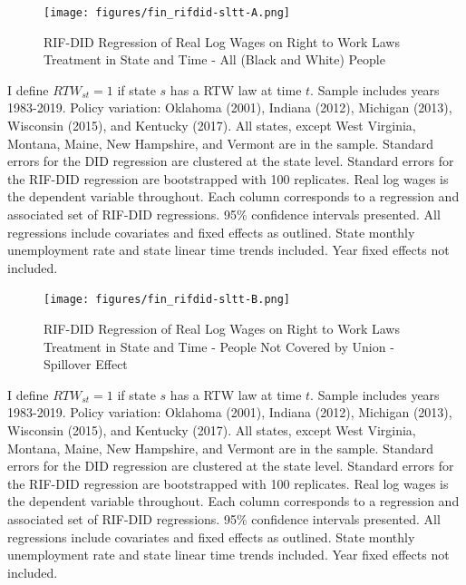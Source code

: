 \documentclass[11pt]{article}
\begin{document}
{\pagebreak
\begin{landscape}
\begin{figure}[ht!]
\centering
    \caption{RIF-DID Regression of Real Log Wages on Right to Work Laws Treatment in State and Time - All (Black and White) People}\label{fig:rifdid-sltt-A}
    \texttt{[image: figures/fin\_rifdid-sltt-A.png]}
\end{figure}
\footnotesize{I define $RTW_{st} = 1$ if state $s$ has a RTW law at time $t$. Sample includes years 1983-2019. Policy variation: Oklahoma (2001), Indiana (2012), Michigan (2013), Wisconsin (2015), and Kentucky (2017). All states, except West Virginia, Montana, Maine, New Hampshire, and Vermont are in the sample. Standard errors for the DID regression are clustered at the state level. Standard errors for the RIF-DID regression are bootstrapped with 100 replicates. Real log wages is the dependent variable throughout. Each column corresponds to a regression and associated set of RIF-DID regressions. 95\% confidence intervals presented. All regressions include covariates and fixed effects as outlined. State monthly unemployment rate and state linear time trends included. Year fixed effects not included.}
\end{landscape}

\pagebreak
\begin{landscape}
\begin{figure}[ht!]
\centering
    \caption{RIF-DID Regression of Real Log Wages on Right to Work Laws Treatment in State and Time - People Not Covered by Union - Spillover Effect}\label{fig:rifdid-sltt-B}
    \texttt{[image: figures/fin\_rifdid-sltt-B.png]}
\end{figure}
\footnotesize{I define $RTW_{st} = 1$ if state $s$ has a RTW law at time $t$. Sample includes years 1983-2019. Policy variation: Oklahoma (2001), Indiana (2012), Michigan (2013), Wisconsin (2015), and Kentucky (2017). All states, except West Virginia, Montana, Maine, New Hampshire, and Vermont are in the sample. Standard errors for the DID regression are clustered at the state level. Standard errors for the RIF-DID regression are bootstrapped with 100 replicates. Real log wages is the dependent variable throughout. Each column corresponds to a regression and associated set of RIF-DID regressions. 95\% confidence intervals presented. All regressions include covariates and fixed effects as outlined. State monthly unemployment rate and state linear time trends included. Year fixed effects not included.}
\end{landscape}

}
\end{document}
